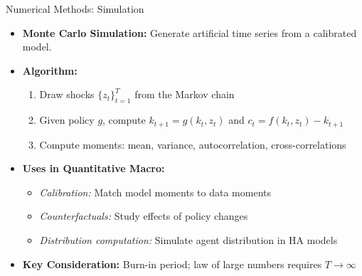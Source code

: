 \documentclass[10pt,english,aspectratio=169]{beamer}
\begin{document}
\begin{frame}{Numerical Methods: Simulation}
\begin{itemize}
\item \textbf{Monte Carlo Simulation:} Generate artificial time series from a calibrated model.

\medskip
\item \textbf{Algorithm:}
\begin{enumerate}
    \item Draw shocks $\{z_t\}_{t=1}^T$ from the Markov chain
    \item Given policy $g$, compute $k_{t+1} = g(k_t, z_t)$ and $c_t = f(k_t, z_t) - k_{t+1}$
    \item Compute moments: mean, variance, autocorrelation, cross-correlations
\end{enumerate}

\medskip
\item \textbf{Uses in Quantitative Macro:}
\begin{itemize}
    \item \emph{Calibration:} Match model moments to data moments
    \item \emph{Counterfactuals:} Study effects of policy changes
    \item \emph{Distribution computation:} Simulate agent distribution in HA models
\end{itemize}

\medskip
\item \textbf{Key Consideration:} Burn-in period; law of large numbers requires $T \to \infty$
\end{itemize}
\end{frame}

\end{document}
